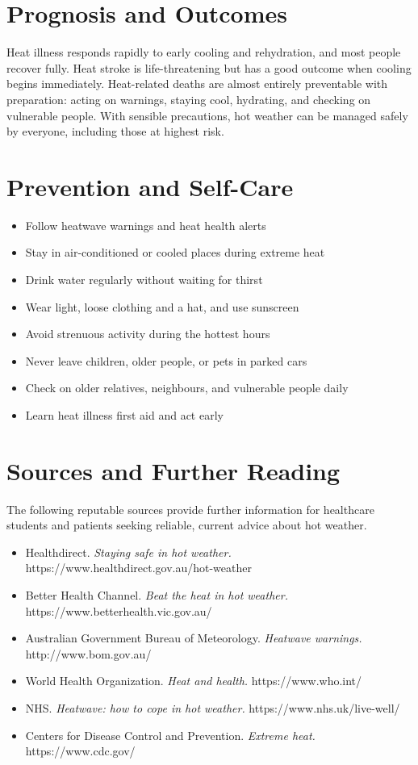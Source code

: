 \section*{Prognosis and Outcomes}
Heat illness responds rapidly to early cooling and rehydration, and most people recover fully. Heat stroke is life-threatening but has a good outcome when cooling begins immediately. Heat-related deaths are almost entirely preventable with preparation: acting on warnings, staying cool, hydrating, and checking on vulnerable people. With sensible precautions, hot weather can be managed safely by everyone, including those at highest risk.

\section*{Prevention and Self-Care}
\begin{itemize}
    \item Follow heatwave warnings and heat health alerts
    \item Stay in air-conditioned or cooled places during extreme heat
    \item Drink water regularly without waiting for thirst
    \item Wear light, loose clothing and a hat, and use sunscreen
    \item Avoid strenuous activity during the hottest hours
    \item Never leave children, older people, or pets in parked cars
    \item Check on older relatives, neighbours, and vulnerable people daily
    \item Learn heat illness first aid and act early
\end{itemize}

\section*{Sources and Further Reading}
The following reputable sources provide further information for healthcare students and patients seeking reliable, current advice about hot weather.

\begin{itemize}
    \item Healthdirect. \textit{Staying safe in hot weather.} https://www.healthdirect.gov.au/hot-weather
    \item Better Health Channel. \textit{Beat the heat in hot weather.} https://www.betterhealth.vic.gov.au/
    \item Australian Government Bureau of Meteorology. \textit{Heatwave warnings.} http://www.bom.gov.au/
    \item World Health Organization. \textit{Heat and health.} https://www.who.int/
    \item NHS. \textit{Heatwave: how to cope in hot weather.} https://www.nhs.uk/live-well/
    \item Centers for Disease Control and Prevention. \textit{Extreme heat.} https://www.cdc.gov/
\end{itemize}
